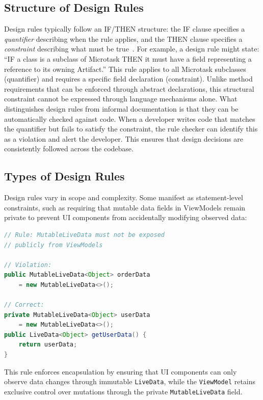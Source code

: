 \documentclass[conference]{IEEEtran}
\begin{document}
\subsection{Structure of Design Rules}

Design rules typically follow an IF/THEN structure: the IF clause specifies a \textit{quantifier} describing when the rule applies, and the THEN clause specifies a \textit{constraint} describing what must be true~\cite{mehrpour2019active}. For example, a design rule might state: ``IF a class is a subclass of Microtask THEN it must have a field representing a reference to its owning Artifact.'' This rule applies to all Microtask subclasses (quantifier) and requires a specific field declaration (constraint). Unlike method requirements that can be enforced through abstract declarations, this structural constraint cannot be expressed through language mechanisms alone. What distinguishes design rules from informal documentation is that they can be automatically checked against code. When a developer writes code that matches the quantifier but fails to satisfy the constraint, the rule checker can identify this as a violation and alert the developer. This ensures that design decisions are consistently followed across the codebase.

\subsection{Types of Design Rules}

Design rules vary in scope and complexity. Some manifest as statement-level constraints, such as requiring that mutable data fields in ViewModels remain private to prevent UI components from accidentally modifying observed data:

\begin{lstlisting}[language=Java,caption={Statement-level design rule example}]
// Rule: MutableLiveData must not be exposed 
// publicly from ViewModels

// Violation:
public MutableLiveData<Object> orderData 
    = new MutableLiveData<>();

// Correct:
private MutableLiveData<Object> userData 
    = new MutableLiveData<>();
public LiveData<Object> getUserData() {
    return userData;
}
\end{lstlisting}

This rule enforces encapsulation by ensuring that UI components can only observe data changes through immutable \texttt{LiveData}, while the \texttt{ViewModel} retains exclusive control over mutations through the private \texttt{MutableLiveData} field.
\end{document}
